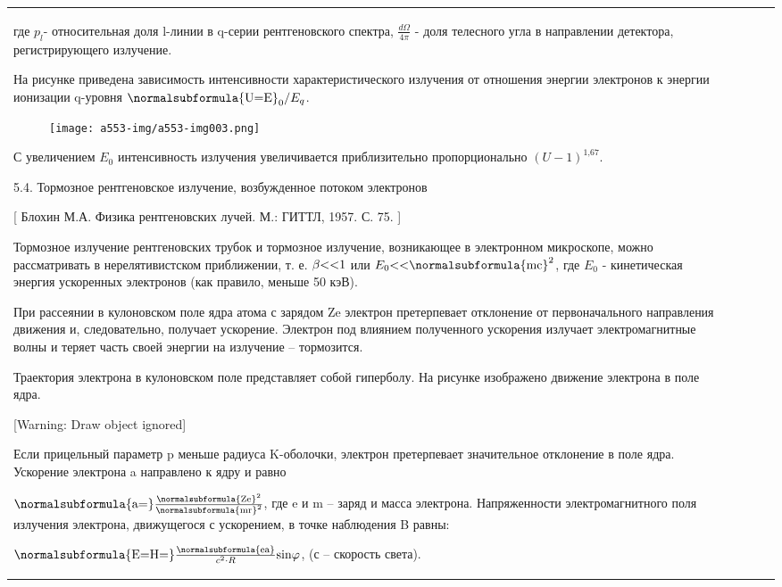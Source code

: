 \documentclass[a4paper,14pt, openany, twoside, draft]{extbook} %
\begin{document}
\begin{flushleft}
\begin{supertabular}{|m{1.7279999cm}|m{1.522cm}|m{1.522cm}|m{1.522cm}|m{1.744cm}|}
где  $p_l${}- относительная доля l{}-линии в q{}-серии рентгеновского спектра,  $\frac{d\Omega }{4\pi }$ - доля телесного угла в направлении детектора, регистрирующего излучение.

На рисунке приведена зависимость интенсивности характеристического излучения от отношения энергии электронов к энергии ионизации q{}-уровня  $\normalsubformula{\text{U=E}}_0/E_q$.

\begin{figure}
\centering
\texttt{[image: a553-img/a553-img003.png]}
\end{figure}
С увеличением  $E_0$ интенсивность излучения увеличивается приблизительно пропорционально  $(U-1)^{\text{1,67}}$.

5.4. Тормозное рентгеновское излучение, возбужденное потоком электронов

[ Блохин М.А. Физика рентгеновских лучей. М.: ГИТТЛ, 1957. С. 75. ]

Тормозное излучение рентгеновских трубок и тормозное излучение, возникающее в электронном микроскопе, можно рассматривать в нерелятивистском приближении, т. е.  $\beta \text{{\textless}{\textless}1}$ или  $E_0\text{{\textless}{\textless}}\normalsubformula{\text{mc}}^2$, где  $E_0$ - кинетическая энергия ускоренных электронов (как правило, меньше 50 кэВ).

При рассеянии в кулоновском поле ядра атома с зарядом Ze электрон претерпевает отклонение от первоначального направления движения и, следовательно, получает ускорение. Электрон под влиянием полученного ускорения излучает электромагнитные волны и теряет часть своей энергии на излучение – тормозится.

Траектория электрона в кулоновском поле представляет собой гиперболу. На рисунке изображено движение электрона в поле ядра.

[Warning: Draw object ignored]

Если прицельный параметр p меньше радиуса K{}-оболочки, электрон претерпевает значительное отклонение в поле ядра. Ускорение электрона a направлено к ядру и равно

 $\normalsubformula{\text{a=}}\frac{\normalsubformula{\text{Ze}}^2}{\normalsubformula{\text{mr}}^2}$, где e и m – заряд и масса электрона. Напряженности электромагнитного поля излучения электрона, движущегося с ускорением, в точке наблюдения B равны:

 $\normalsubformula{\text{E=H=}}\frac{\normalsubformula{\text{ea}}}{c^2\cdot R}\text{sin}\varphi $,  (с – скорость света).


\end{supertabular}
\end{flushleft}
\end{document}
